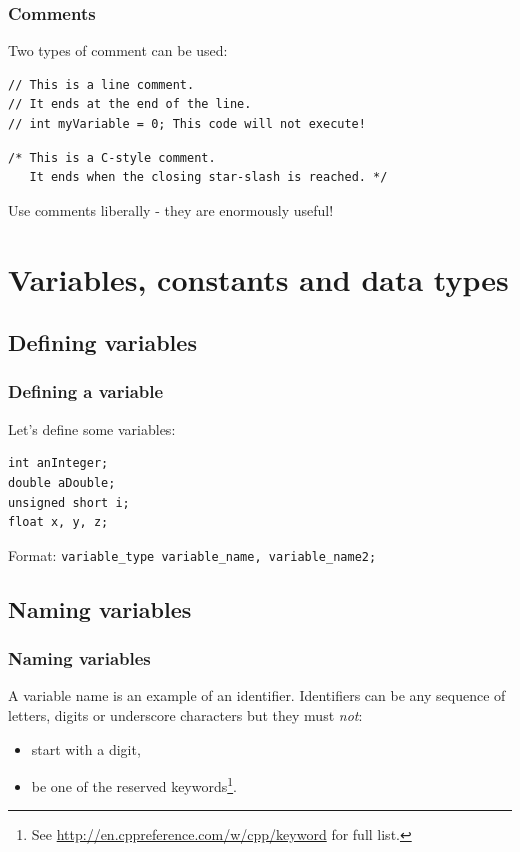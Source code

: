 \documentclass{beamer}
\begin{document}
\begin{frame}[fragile]
  \frametitle{Comments}
  Two types of comment can be used:
  \begin{lstlisting}
// This is a line comment.
// It ends at the end of the line.
// int myVariable = 0; This code will not execute!
  \end{lstlisting}
  \begin{lstlisting}
/* This is a C-style comment.
   It ends when the closing star-slash is reached. */
  \end{lstlisting}
    Use comments liberally - they are enormously useful!
\end{frame}

\section{Variables, constants and data types}

\subsection{Defining variables}

\begin{frame}[fragile]
\frametitle{Defining a variable}
  Let's define some variables:
  \begin{lstlisting}
int anInteger;
double aDouble;
unsigned short i;
float x, y, z;
  \end{lstlisting}
Format: \texttt{\textcolor{bluekeywords}{variable\_type} variable\_name, variable\_name2;}

\end{frame}

\subsection{Naming variables}

\begin{frame}
  \frametitle{Naming variables}
  
  A variable name is an example of an identifier.
  \pause
  Identifiers can be any sequence of letters, digits or underscore characters but they must \emph{not}:
	\begin{itemize}
  	\item start with a digit,
	  \item be one of the reserved keywords\footnote{See \url{http://en.cppreference.com/w/cpp/keyword} for full list.}.
	\end{itemize}
	\pause
\end{frame}
\end{document}
